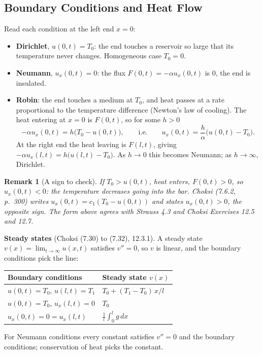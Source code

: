 \documentclass{article}
\newtheorem{remark}{Remark}
\begin{document}
\subsection{Boundary Conditions and Heat Flow}
Read each condition at the left end $x = 0$:
\begin{itemize}
    \item \textbf{Dirichlet}, $u(0,t) = T_0$: the end touches a reservoir so large that its temperature never changes. Homogeneous case $T_0 = 0$.
    \item \textbf{Neumann}, $u_x(0,t) = 0$: the flux $F(0,t) = -\alpha u_x(0,t)$ is $0$, the end is insulated.
    \item \textbf{Robin}: the end touches a medium at $T_0$, and heat passes at a rate proportional to the temperature difference (Newton's law of cooling). The heat entering at $x = 0$ is $F(0,t)$, so for some $h > 0$
    \begin{equation}
        -\alpha u_x(0,t) = h\big(T_0 - u(0,t)\big), \qquad \text{i.e.} \qquad u_x(0,t) = \frac{h}{\alpha}\big(u(0,t) - T_0\big).
    \end{equation}
    At the right end the heat leaving is $F(l,t)$, giving $-\alpha u_x(l,t) = h\big(u(l,t) - T_0\big)$. As $h \to 0$ this becomes Neumann; as $h \to \infty$, Dirichlet.
\end{itemize}
\begin{remark}[A sign to check]
    If $T_0 > u(0,t)$, heat enters, $F(0,t) > 0$, so $u_x(0,t) < 0$: the temperature decreases going into the bar. Choksi (7.6.2, p.~300) writes $u_x(0,t) = c_1(T_0 - u(0,t))$ and states $u_x(0,t) > 0$, the opposite sign. The form above agrees with Strauss 4.3 and Choksi Exercises 12.5 and 12.7.
\end{remark}
\textbf{Steady states} (Choksi (7.30) to (7.32), 12.3.1). A steady state $v(x) = \lim_{t\to\infty}u(x,t)$ satisfies $v'' = 0$, so $v$ is linear, and the boundary conditions pick the line:
\begin{center}
\renewcommand{\arraystretch}{1.4}
\begin{tabular}{ll}
    Boundary conditions & Steady state $v(x)$ \\
    \hline
    $u(0,t) = T_0$, $u(l,t) = T_1$ & $T_0 + (T_1 - T_0)\,x/l$ \\
    $u(0,t) = T_0$, $u_x(l,t) = 0$ & $T_0$ \\
    $u_x(0,t) = 0 = u_x(l,t)$ & $\frac1l\int_0^l g\,dx$
\end{tabular}
\end{center}
For Neumann conditions every constant satisfies $v'' = 0$ and the boundary conditions; conservation of heat picks the constant.
\end{document}
